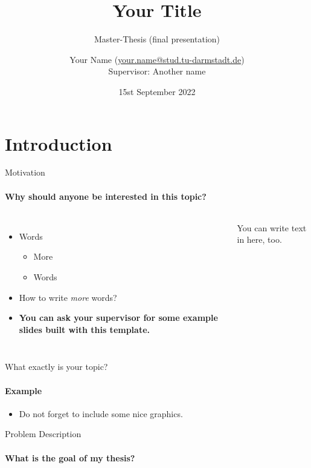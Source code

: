 \documentclass[
	english,%
	aspectratio=169,%
	color={accentcolor=1b},
	logo=true,%
	colorframetitle=true,%
	authorontitle=true,
	usepdftitle=false,
	]{tudabeamer}
\title{Your Title}
\subtitle{Master-Thesis (final presentation)}
\author[Your Name]{Your Name \normalfont(\href{mailto:your.name@stud.tu-darmstadt.de}{your.name@stud.tu-darmstadt.de})\\
Supervisor: Another name
}
\institute[]{Real-Time Systems Lab} %
\date{15st September 2022}
\begin{document}
\maketitle

%
%

\section{Introduction}

\begin{frame}{Motivation}
	\framesubtitle{Why should anyone be interested in this topic?}
	\label{motivation}
	
	\begin{columns}[onlytextwidth,c]
		\begin{itemize}
			\item Words
			\begin{itemize}
				\item More
				\item Words
			\end{itemize}
			\vspace{1em}
		
			\item How to write \textit{more} words?
			
			\item \textbf{You can ask your supervisor for some example slides built with this template.}
		\end{itemize}
	
		\vspace{-0.5em}
		You can write text in here, too.
	\end{columns}
\end{frame}

\begin{frame}{What exactly is your topic?}
	\framesubtitle{Example}
	\label{what-is-this}
	
	\begin{itemize}
		\item Do not forget to include some nice graphics.
	\end{itemize}
\end{frame}

\begin{frame}{Problem Description}
	\framesubtitle{What is the goal of my thesis?}
	\label{goal}
\end{frame}
\end{document}
